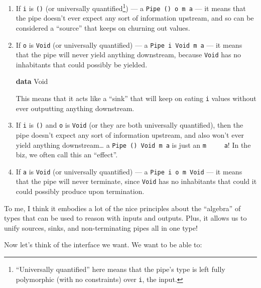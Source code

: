\documentclass[]{article}
\newenvironment{Shaded}{}{}
\newcommand{\DataTypeTok}[1]{\textcolor[rgb]{0.56,0.13,0.00}{#1}}
\newcommand{\KeywordTok}[1]{\textcolor[rgb]{0.00,0.44,0.13}{\textbf{#1}}}
\begin{document}
\begin{enumerate}
\def\labelenumi{\arabic{enumi}.}
\item
  If \texttt{i} is \texttt{()} (or universally quantified\footnote{``Universally
    quantified'' here means that the pipe's type is left fully polymorphic (with
    no constraints) over \texttt{i}, the input.}) --- a
  \texttt{Pipe\ ()\ o\ m\ a} --- it means that the pipe doesn't ever expect any
  sort of information upstream, and so can be considered a ``source'' that keeps
  on churning out values.
\item
  If \texttt{o} is \texttt{Void} (or universally quantified) --- a
  \texttt{Pipe\ i\ Void\ m\ a} --- it means that the pipe will never yield
  anything downstream, because \texttt{Void} has no inhabitants that could
  possibly be yielded.

\begin{Shaded}
\begin{Highlighting}[]
\KeywordTok{data} \DataTypeTok{Void}
\end{Highlighting}
\end{Shaded}

  This means that it acts like a ``sink'' that will keep on eating \texttt{i}
  values without ever outputting anything downstream.
\item
  If \texttt{i} is \texttt{()} and \texttt{o} is \texttt{Void} (or they are both
  universally quantified), then the pipe doesn't expect any sort of information
  upstream, and also won't ever yield anything downstream\ldots{} a
  \texttt{Pipe\ ()\ Void\ m\ a} is just an \texttt{m\ \ \ \ \ a}! In the biz, we
  often call this an ``effect''.
\item
  If \texttt{a} is \texttt{Void} (or universally quantified) --- a
  \texttt{Pipe\ i\ o\ m\ Void} --- it means that the pipe will never terminate,
  since \texttt{Void} has no inhabitants that could it could possibly produce
  upon termination.
\end{enumerate}

To me, I think it embodies a lot of the nice principles about the ``algebra'' of
types that can be used to reason with inputs and outputs. Plus, it allows us to
unify sources, sinks, and non-terminating pipes all in one type!

Now let's think of the interface we want. We want to be able to:
\end{document}
